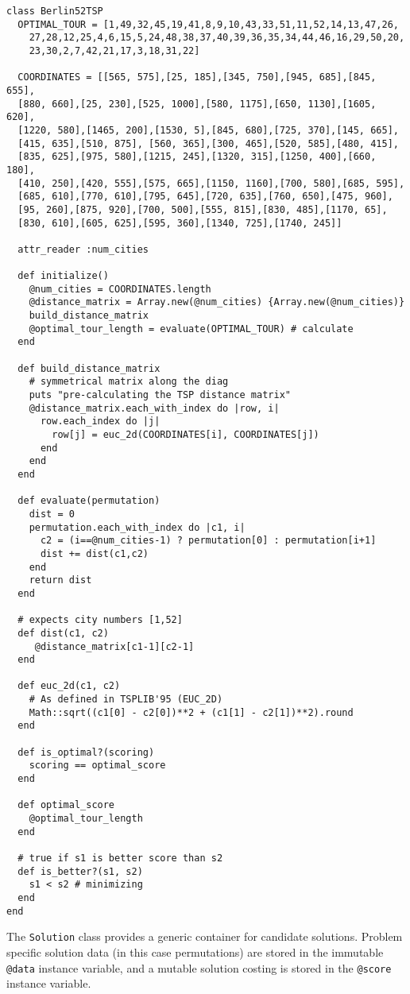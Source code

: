 \begin{lstlisting}
class Berlin52TSP
  OPTIMAL_TOUR = [1,49,32,45,19,41,8,9,10,43,33,51,11,52,14,13,47,26,
    27,28,12,25,4,6,15,5,24,48,38,37,40,39,36,35,34,44,46,16,29,50,20,
    23,30,2,7,42,21,17,3,18,31,22]
        
  COORDINATES = [[565, 575],[25, 185],[345, 750],[945, 685],[845, 655],
  [880, 660],[25, 230],[525, 1000],[580, 1175],[650, 1130],[1605, 620], 
  [1220, 580],[1465, 200],[1530, 5],[845, 680],[725, 370],[145, 665],
  [415, 635],[510, 875], [560, 365],[300, 465],[520, 585],[480, 415],
  [835, 625],[975, 580],[1215, 245],[1320, 315],[1250, 400],[660, 180],
  [410, 250],[420, 555],[575, 665],[1150, 1160],[700, 580],[685, 595],
  [685, 610],[770, 610],[795, 645],[720, 635],[760, 650],[475, 960],
  [95, 260],[875, 920],[700, 500],[555, 815],[830, 485],[1170, 65],
  [830, 610],[605, 625],[595, 360],[1340, 725],[1740, 245]]
  
  attr_reader :num_cities

  def initialize()
    @num_cities = COORDINATES.length        
    @distance_matrix = Array.new(@num_cities) {Array.new(@num_cities)}
    build_distance_matrix
    @optimal_tour_length = evaluate(OPTIMAL_TOUR) # calculate
  end
  
  def build_distance_matrix
    # symmetrical matrix along the diag
    puts "pre-calculating the TSP distance matrix"
    @distance_matrix.each_with_index do |row, i|
      row.each_index do |j|
        row[j] = euc_2d(COORDINATES[i], COORDINATES[j])
      end
    end
  end

  def evaluate(permutation)
    dist = 0    
    permutation.each_with_index do |c1, i|
      c2 = (i==@num_cities-1) ? permutation[0] : permutation[i+1] 
      dist += dist(c1,c2)
    end
    return dist
  end
  
  # expects city numbers [1,52]
  def dist(c1, c2)
     @distance_matrix[c1-1][c2-1]
  end
  
  def euc_2d(c1, c2)
    # As defined in TSPLIB'95 (EUC_2D)
    Math::sqrt((c1[0] - c2[0])**2 + (c1[1] - c2[1])**2).round
  end

  def is_optimal?(scoring)
    scoring == optimal_score
  end

  def optimal_score
    @optimal_tour_length
  end
  
  # true if s1 is better score than s2
  def is_better?(s1, s2)
    s1 < s2 # minimizing
  end
end
\end{lstlisting}

The \texttt{Solution} class provides a generic container for candidate solutions. Problem specific solution data (in this case permutations) are stored in the immutable \texttt{@data} instance variable, and a mutable solution costing is stored in the \texttt{@score} instance variable. 

